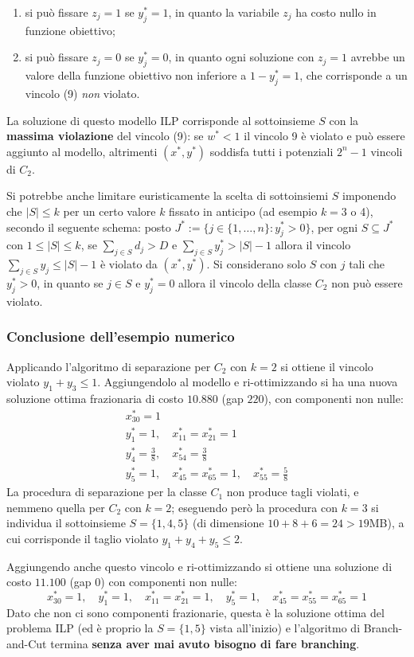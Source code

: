 \begin{itemize}
\begin{enumerate}
		\item si può fissare $z_j=1$ se $y_j^*=1$, in quanto la variabile $z_j$ ha costo nullo in funzione obiettivo;
		\item si può fissare $z_j=0$ se $y_j^*=0$, in quanto ogni soluzione con $z_j=1$ avrebbe un valore della funzione obiettivo non inferiore a $1-y_j^*=1$, che corrisponde a un vincolo (9) \textit{non} violato.
	\end{enumerate}
	La soluzione di questo modello ILP corrisponde al sottoinsieme $S$ con la \textbf{massima violazione} del vincolo (9): se $w^*<1$ il vincolo 9 è violato e può essere aggiunto al modello, altrimenti $(x^*,y^*)$ soddisfa tutti i potenziali $2^n-1$ vincoli di $C_2$.

	Si potrebbe anche limitare euristicamente la scelta di sottoinsiemi $S$ imponendo che $|S|\le k$ per un certo valore $k$ fissato in anticipo (ad esempio $k=3$ o 4), secondo il seguente schema: posto $J^*:=\{j\in \{1,\dots,n\}:y_j^*>0\}$, per ogni $S\subseteq J^*$ con $1\le |S|\le k$, se $\sum_{j\in S}d_j>D$ e $\sum_{j\in S}y_j^*>|S|-1$ allora il vincolo $\sum_{j\in S}y_j\le |S|-1$ è violato da $(x^*,y^*)$. Si considerano solo $S$ con $j$ tali che $y_j^*>0$, in quanto se $j\in S$ e $y_j^*=0$ allora il vincolo della classe $C_2$ non può essere violato.
\end{itemize}

\subsubsection*{Conclusione dell'esempio numerico}
Applicando l'algoritmo di separazione per $C_2$ con $k=2$ si ottiene il vincolo violato $y_1+y_3\le 1$. Aggiungendolo al modello e ri-ottimizzando si ha una nuova soluzione ottima frazionaria di costo $10.880$ (gap $220$), con componenti non nulle:
\begin{equation*}
	\begin{aligned}
		x_{30}^*=1\\
		y_1^*=1,\quad x_{11}^*=x_{21}^*=1\\
		y_4^*=\tfrac{3}{8},\quad x_{54}^*=\tfrac{3}{8}\\
		y_5^*=1,\quad x_{45}^*=x_{65}^*=1,\quad x_{55}^*=\tfrac{5}{8}
	\end{aligned}
\end{equation*}
La procedura di separazione per la classe $C_1$ non produce tagli violati, e nemmeno quella per $C_2$ con $k=2$; eseguendo però la procedura con $k=3$ si individua il sottoinsieme $S=\{1,4,5\}$ (di dimensione $10+8+6=24>19$MB), a cui corrisponde il taglio violato $y_1+y_4+y_5\le 2$.

Aggiungendo anche questo vincolo e ri-ottimizzando si ottiene una soluzione di costo $11.100$ (gap $0$) con componenti non nulle:
\begin{equation*}
	x_{30}^*=1,\quad y_1^*=1,\quad x_{11}^*=x_{21}^*=1,\quad y_5^*=1,\quad x_{45}^*=x_{55}^*=x_{65}^*=1
\end{equation*}
Dato che non ci sono componenti frazionarie, questa è la soluzione ottima del problema ILP (ed è proprio la $S=\{1,5\}$ vista all'inizio) e l'algoritmo di Branch-and-Cut termina \textbf{senza aver mai avuto bisogno di fare branching}.
